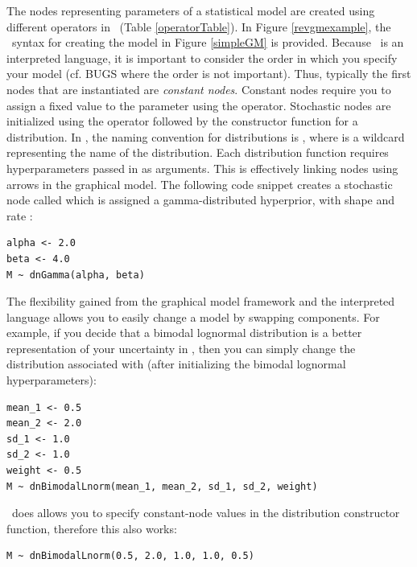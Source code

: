 The nodes representing parameters of a statistical model are created using different operators in \Rev~(Table \ref{operatorTable}). 
In Figure \ref{revgmexample}, the \Rev~syntax for creating the model in Figure \ref{simpleGM} is provided.
Because \Rev~is an interpreted language, it is important to consider the order in which you specify your model (cf. BUGS where the order is not important). 
Thus, typically the first nodes that are instantiated are \emph{constant nodes}. 
Constant nodes require you to assign a fixed value to the parameter using the \cl{<-} operator. 
Stochastic nodes are initialized using the \cl{\rbdn} operator followed by the constructor function for a distribution. 
In \Rev, the naming convention for distributions is , where \cl{*} is a wildcard representing the name of the distribution. 
Each distribution function requires hyperparameters passed in as arguments. 
This is effectively linking nodes using arrows in the graphical model.
The following code snippet creates a stochastic node called  which is assigned a gamma-distributed hyperprior, with shape  and rate :
{\tt \begin{snugshade*}
\begin{lstlisting}
alpha <- 2.0
beta <- 4.0
M ~ dnGamma(alpha, beta)
\end{lstlisting}
\end{snugshade*}}

The flexibility gained from the graphical model framework and the interpreted language allows you to easily change a model by swapping components. 
For example, if you decide that a bimodal lognormal distribution is a better representation of your uncertainty in , then you can simply change the distribution associated with  (after initializing the bimodal lognormal hyperparameters):
{\tt \begin{snugshade*}
\begin{lstlisting}
mean_1 <- 0.5
mean_2 <- 2.0
sd_1 <- 1.0
sd_2 <- 1.0
weight <- 0.5
M ~ dnBimodalLnorm(mean_1, mean_2, sd_1, sd_2, weight)
\end{lstlisting}
\end{snugshade*}}

\Rev~does allows you to specify constant-node values in the distribution constructor function, therefore this also works:
{\tt \begin{snugshade*}
\begin{lstlisting}
M ~ dnBimodalLnorm(0.5, 2.0, 1.0, 1.0, 0.5)
\end{lstlisting}
\end{snugshade*}}



